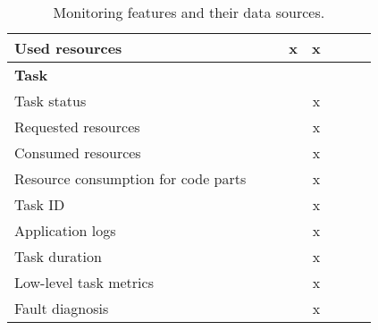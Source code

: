 \begin{table}[htbp]
{\begin{tabular}{lccccccc}
            Used resources                      &                   &                               & x                        & x                   &                         &                           &                           \\
            \midrule
            \multicolumn{8}{l}{\textbf{Task}}                                                                                                                                                                                          \\[3pt]
            Task status                         &                   &                               &                          & x                   &                         &                           &                           \\
            Requested resources                 &                   &                               &                          & x                   &                         &                           &                           \\
            Consumed resources                  &                   &                               &                          & x                   &                         &                           &                           \\
            Resource consumption for code parts &                   &                               &                          & x                   &                         &                           &                           \\
            Task ID                             &                   &                               &                          & x                   &                         &                           &                           \\
            Application logs                    &                   &                               &                          & x                   &                         &                           &                           \\
            Task duration                       &                   &                               &                          & x                   &                         &                           &                           \\
            Low-level task metrics              &                   &                               &                          & x                   &                         &                           &                           \\
            Fault diagnosis                     &                   &                               &                          & x                   &                         &                           &                           \\
            \bottomrule
        \end{tabular}
    }
    \caption{Monitoring features and their data sources.}
    \label{tab:monitoring-features}
\end{table}

